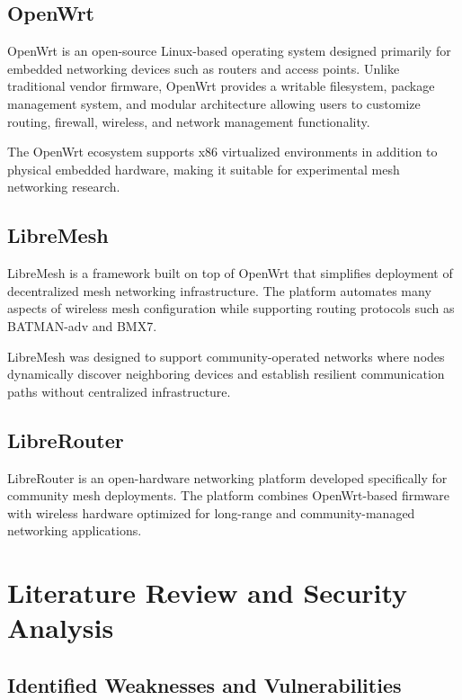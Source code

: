 \documentclass[conference]{IEEEtran}
\begin{document}
\subsection{OpenWrt}

OpenWrt is an open-source Linux-based operating system designed primarily for embedded networking devices such as routers and access points. Unlike traditional vendor firmware, OpenWrt provides a writable filesystem, package management system, and modular architecture allowing users to customize routing, firewall, wireless, and network management functionality.

The OpenWrt ecosystem supports x86 virtualized environments in addition to physical embedded hardware, making it suitable for experimental mesh networking research.

\subsection{LibreMesh}

LibreMesh is a framework built on top of OpenWrt that simplifies deployment of decentralized mesh networking infrastructure. The platform automates many aspects of wireless mesh configuration while supporting routing protocols such as BATMAN-adv and BMX7.

LibreMesh was designed to support community-operated networks where nodes dynamically discover neighboring devices and establish resilient communication paths without centralized infrastructure.

\subsection{LibreRouter}

LibreRouter is an open-hardware networking platform developed specifically for community mesh deployments. The platform combines OpenWrt-based firmware with wireless hardware optimized for long-range and community-managed networking applications.

\section{Literature Review and Security Analysis}

\subsection{Identified Weaknesses and Vulnerabilities}
\end{document}
